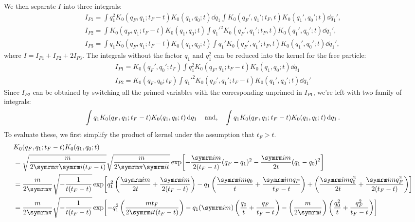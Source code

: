 We then separate $I$ into three integrals:
\begin{gather}
    I_{P1} = \int q_1^2K_0(q_F, q_1; t_F - t)K_0(q_1, q_0; t)\dd{q_1} \int K_0(q_F', q_1'; t_F, t)K_0(q_1', q_0'; t)\dd{q_1'}, \label{eq:spring_IP1}\\
    I_{P2} = \int K_0(q_F, q_1; t_F - t)K_0(q_1, q_0; t) \int q_1'^2K_0(q_F', q_1'; t_F, t)K_0(q_1', q_0'; t)\dd{q_1'}, \label{eq:spring_IP2}\\
    I_{P3} = \int q_1K_0(q_F, q_1; t_F - t)K_0(q_1, q_0; t) \int q_1'K_0(q_F', q_1'; t_F, t)K_0(q_1', q_0'; t) \dd{q_1'} \label{eq:spring_IP3},
\end{gather}
where $I = I_{P1} + I_{P2} + 2I_{P3}$. The integrals without the factor $q_1$ and $q_1^2$ can be reduced into the kernel for the free particle:
\begin{gather}
    I_{P1} = K_0(q_F', q_0'; t_F)\int q_1^2K_0(q_F, q_1; t_F - t)K_0(q_1, q_0; t)\dd{q_1} \\
    I_{P2} = K_0(q_F, q_0; t_F)\int q_1'^2 K_0(q_F', q_1'; t_F - t)K_0(q_1', q_0'; t)\dd{q_1'}
\end{gather}
Since $I_{P2}$ can be obtained by switching all the primed variables with the corresponding unprimed in $I_{P1}$, we're left with two family of integrals:
\begin{equation}
    \int q_1K_0(q_F, q_1; t_F - t)K_0(q_1, q_0; t)\dd{q_1} \quad\textrm{and,}\quad \int q_1K_0(q_F, q_1; t_F - t)K_0(q_1, q_0; t)\dd{q_1}. \label{eq:spring_family_of_integrals}
\end{equation}
To evaluate these, we first simplify the product of kernel under the assumption that $t_F > t$.
\begin{align}
    &K_0(q_F, q_1; t_F - t)K_0(q_1, q_0; t) \nonumber\\
    &= \sqrt{\frac{m}{2\cpi\im(t_F - t)}}\sqrt{\frac{m}{2\cpi\im t}}\exp[-\frac{\im m}{2(t_F - t)}(q_F - q_1)^2 - \frac{\im m}{2t}(q_1 - q_0)^2] \\
    &= \frac{m}{2\cpi}\sqrt{-\frac{1}{t(t_F - t)}} \exp[q_1^2\left(\frac{\im m}{2t} + \frac{\im m}{2(t_F - t)}\right) - q_1\left(\frac{\im m q_0}{t} + \frac{\im m q_F}{t_F - t}\right) + \left(\frac{\im m q_0^2}{2t} + \frac{\im m q_F^2}{2(t_F - t)}\right)] \nonumber \\
    &= \frac{m}{2\cpi}\sqrt{-\frac{1}{t(t_F - t)}} \exp[-q_1^2\left(\frac{m t_F}{2\im t(t_F - t)}\right) - q_1(\im m)\left(\frac{q_0}{t} + \frac{q_F}{t_F - t}\right) - \left(\frac{m}{2\im}\right)\left(\frac{q_0^2}{t} + \frac{q_F^2}{t_F - t}\right)] \nonumber
\end{align}
